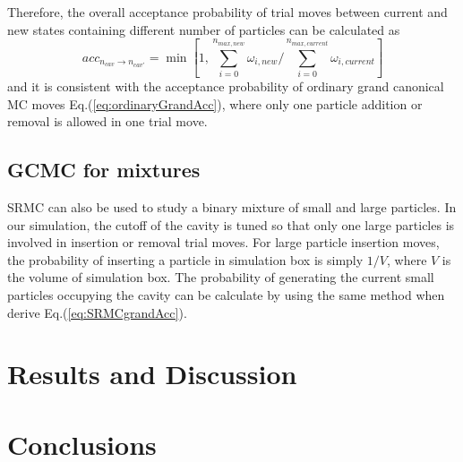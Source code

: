 \documentclass[aip,jcp,12pt]{revtex4-1}
\begin{document}
Therefore, the overall acceptance probability of trial moves between current and new states containing different number of particles can be calculated as 
\begin{equation}
\label{eq:SRMCgrandAcc}
acc_{n_{cav}\rightarrow n_{cav'}} = \min[1,{\sum\limits_{i=0}^{n_{max,new}} \omega_{i,new}} / {\sum\limits_{i=0}^{n_{max,current}} \omega_{i,current}}]
\end{equation}
and it is consistent with the acceptance probability of ordinary grand canonical MC moves Eq.(\ref{eq:ordinaryGrandAcc}), where only one particle addition or removal is allowed in one trial move. 

\subsection{GCMC for mixtures}
SRMC can also be used to study a binary mixture of small and large particles.  In our simulation, the cutoff of the cavity is tuned so that only one large particles is involved in insertion or removal trial moves. For large particle insertion moves, the probability of inserting a particle in simulation box is simply $1/V$, where $V$ is the volume of simulation box. The probability of generating the current small particles occupying  the cavity can be calculate by using the same method when derive Eq.(\ref{eq:SRMCgrandAcc}). 


\section{Results and Discussion}


\section{Conclusions}





\end{document}
